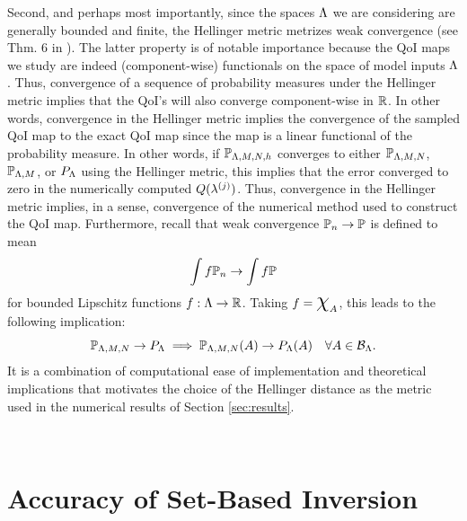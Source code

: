Second, and perhaps most importantly, since the spaces ${\Lambda}$ we are considering are generally bounded and finite, the Hellinger metric metrizes weak convergence (see Thm. 6 in \cite{GS02}).
The latter property is of notable importance because the QoI maps we study are indeed (component-wise) functionals on the space of model inputs ${\Lambda}$. 
Thus, convergence of a sequence of probability measures under the Hellinger metric implies that the QoI's will also converge component-wise in $\mathbb{R}$. 
In other words, convergence in the Hellinger metric implies the convergence of the sampled QoI map to the exact QoI map since the map is a linear functional of the probability measure. 
In other words, if $\mathbb{P}_{{\Lambda},M,N,h}$ converges to either $\mathbb{P}_{{\Lambda},M,N}$, $\mathbb{P}_{{\Lambda},M}$, or $P_{\Lambda}$ using the Hellinger metric, this implies that the error converged to zero in the numerically computed $Q(\lambda^{(j)})$.
Thus, convergence in the Hellinger metric implies, in a sense, convergence of the numerical method used to construct the QoI map. 
Furthermore, recall that weak convergence $\mathbb{P}_n \to \mathbb{P}$ is defined to mean 
\[
\int f \mathbb{P}_n \to \int f \mathbb{P}
\]
for bounded Lipschitz functions $f:{\Lambda}\to\mathbb{R}$. 
Taking $f = \Chi_A$, this leads to the following implication:  
\[
\mathbb{P}_{{\Lambda}, M, N} \to P_{\Lambda} \implies \mathbb{P}_{{\Lambda}, M, N} (A) \to P_{\Lambda} (A) \quad \forall{A\in\mathcal{B}_{{\Lambda}}}.
\]
It is a combination of computational ease of implementation and theoretical implications that motivates the choice of the Hellinger distance as the metric used in the numerical results of Section \ref{sec:results}.



\
\section{Accuracy of Set-Based Inversion}\label{sec:ch03-set}




